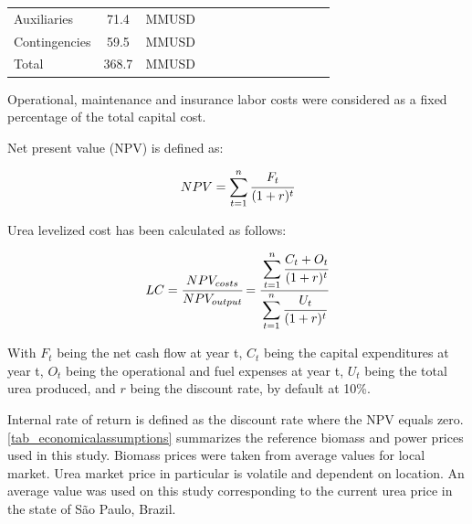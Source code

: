 \documentclass[a4paper, titlepage]{article}
\begin{document}
\begin{table}
\begin{tabular}{|| C{2.3cm} | c | c | c | c | C{1.4cm} | C{1.2cm} | c | c | C{0.9cm} | C{1.4cm} | C{1.5cm} | C{0.9cm} ||}
        Auxiliaries      & 71.4                                                & MMUSD                                    &                                        &                 &          &       &        &                 &      &     &      & \\
        Contingencies    & 59.5                                                & MMUSD                                    &                                        &                 &          &       &        &                 &      &     &      & \\
        \hline
        Total            & 368.7                                               & MMUSD                                    &                                        &                 &          &       &        &                 &      &     &      & \\
        \hline
    \end{tabular}

\end{table}

Operational, maintenance and insurance labor costs were considered as a fixed percentage of the total capital cost.

Net present value (NPV) is defined as:

\begin{equation}
    NPV = \sum_{t=1}^n \cfrac{F_t}{(1+r)^t}
\end{equation}

Urea levelized cost has been calculated as follows:

\begin{equation}
    LC = \cfrac{NPV_{costs}}{NPV_{output}} = \cfrac{\displaystyle\sum_{t=1}^n \cfrac{C_t + O_t}{(1+r)^t}}{\displaystyle\sum_{t=1}^n \cfrac{U_t}{(1+r)^t}}
\end{equation}

With $F_t$ being the net cash flow at year t, $C_t$ being the capital expenditures at year t, $O_t$ being the
operational and fuel expenses at year t, $U_t$ being the total urea produced, and $r$ being the discount rate,
by default at 10\%.

Internal rate of return is defined as the discount rate where the NPV equals zero.
\autoref{tab_economicalassumptions} summarizes the reference biomass and power prices used in this study.
Biomass prices were taken from average values for local market. Urea market price in particular is volatile and
dependent on location. An average value was used on this study corresponding to the current urea price in the state of
São Paulo, Brazil.
\end{document}

